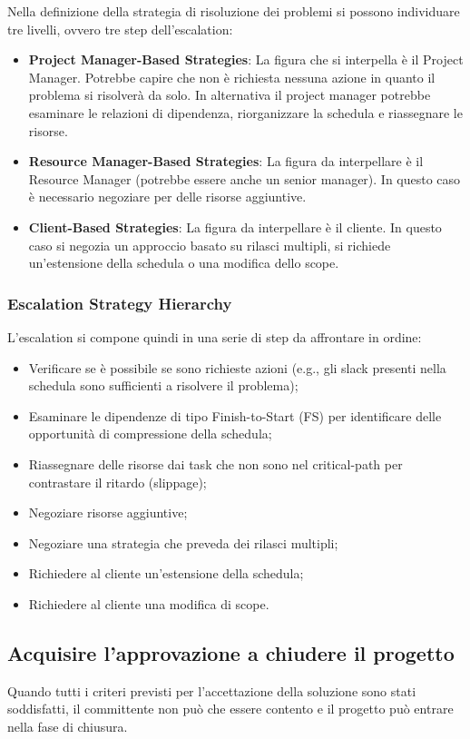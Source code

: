 \noindent Nella definizione della strategia di risoluzione dei problemi si possono individuare tre livelli, ovvero tre step dell'escalation:
\begin{itemize}
	\item \textbf{Project Manager-Based Strategies}: La figura che si interpella è il Project Manager. Potrebbe capire che non è richiesta nessuna azione in quanto il problema si risolverà da solo. In alternativa il project manager potrebbe esaminare le relazioni di dipendenza, riorganizzare la schedula e riassegnare le risorse.
	\item \textbf{Resource Manager-Based Strategies}: La figura da interpellare è il Resource Manager (potrebbe essere anche un senior manager). In questo caso è necessario negoziare per delle risorse aggiuntive.
	\item \textbf{Client-Based Strategies}: La figura da interpellare è il cliente. In questo caso si negozia un approccio basato su rilasci multipli, si richiede un’estensione della schedula o una modifica dello scope.
\end{itemize}

\subsubsection{Escalation Strategy Hierarchy}
L'escalation si compone quindi in una serie di step da affrontare in ordine:
\begin{itemize}
	\item Verificare se è possibile se sono richieste azioni (e.g., gli slack presenti nella schedula sono sufficienti a risolvere il problema);
	\item Esaminare le dipendenze di tipo Finish-to-Start (FS) per identificare delle opportunità di compressione della schedula;
	\item Riassegnare delle risorse dai task che non sono nel critical-path per contrastare il ritardo (slippage);
	\item Negoziare risorse aggiuntive;
	\item Negoziare una strategia che preveda dei rilasci multipli;
	\item Richiedere al cliente un’estensione della schedula;
	\item Richiedere al cliente una modifica di scope.
\end{itemize}

\subsection{Acquisire l’approvazione a chiudere il progetto}
Quando tutti i criteri previsti per l’accettazione della soluzione sono stati soddisfatti, il committente non può che essere contento e il progetto può entrare nella fase di chiusura.
